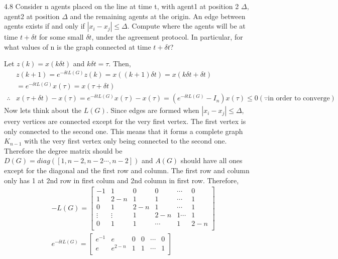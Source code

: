 \documentclass{article}
\begin{document}
\begin{problem} 4.8
    Consider n agents placed on the line at time t, with agent1 at position 2 $\Delta$, agent2 at position $\Delta$ and the remaining agents at the origin. An edge between agents exists if and only if $|x_i - x_j| \leq \Delta$. Compute where the agents will be at time $t + \delta t$ for some small $\delta t$, under the agreement protocol. In particular, for what values of n is the graph connected at time $t + \delta t$?

    Let $z(k) = x(k\delta t)$ and $k\delta t = \tau$. Then, 
    \begin{align*}
        &z(k + 1) = e^{-\delta t L(G)} z(k) = x((k+1)\delta t)=  x(k \delta t + \delta t)\\
        &=e^{-\delta t L(G)}  x(\tau) = x (\tau + \delta t)\\
        \therefore & x (\tau + \delta t) - x(\tau) = e^{-\delta t L(G)}  x(\tau) - x(\tau) = (e^{-\delta t L(G)} - I_n) x(\tau) \leq 0  (\because \text{in order to converge})
    \end{align*}
    Now lets think about the $L(G)$. Since edges are formed when $|x_i - x_j| \leq \Delta$, every vertices are connected except for the very first vertex. The first vertex is only connected to the second one. This means that it forms a complete graph $K_{n-1}$ with the very first vertex only being connected to the second one. Therefore the degree matrix should be $D(G) = diag([1, n-2, n-2 \cdots , n-2])$ and $A(G)$ should have all ones except for the diagonal and the first row and column. The first row and column only has 1 at 2nd row in first colum and 2nd column in first row. Therefore, 
    \begin{align*}
        &-L(G) = \begin{bmatrix*}
            -1 & 1 & 0 & 0 & \cdots &0 \\
             1 & 2-n & 1 & 1 & \cdots & 1\\
             0 & 1 & 2-n & 1 & \cdots & 1 \\
             \vdots & \vdots & 1&2-n &1 \cdots &1\\
             0& 1&1&\cdots &1&2-n\\
        \end{bmatrix*}\\
        &e^{-\delta t L(G)} = \begin{bmatrix*}
            e^{-1} & e & 0 & 0 & \cdots &0 \\
            e & e^{2-n} & 1 & 1 & \cdots & 1\\

\end{bmatrix*}
\end{align*}
\end{problem}
\end{document}
